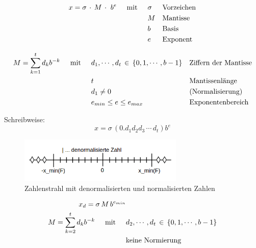 \begin{align*}
x = \sigma\,\cdot\,M\,\cdot\,\,b^e \hspace{0.5cm} \text{mit} \hspace{0.5cm} & \sigma && \text{Vorzeichen}\\
& M && \text{Mantisse} \\
& b && \text{Basis} \\
& e && \text{Exponent}
\end{align*}

\begin{align*}
M = \sum^t_{k=1} d_k b^{-k} \hspace{0.5cm} \text{mit} \hspace{0.5cm} & d_1,\cdots,d_t\, \in\,\{0,1,\cdots,b-1\} && \text{Ziffern der Mantisse}\\
& t && \text{Mantissenlänge} \\
& d_1 \neq 0 && \text{(Normalisierung)} \\
& e_{min} \leq e \leq e_{max} && \text{Exponentenbereich}
\end{align*}

Schreibweise:
\begin{equation*}
x = \sigma\,(0.d_1d_2d_3\,\cdots\,d_t)b^e
\end{equation*}

\begin{figure}[htbp]
  \centering
  \includegraphics[width=0.7\textwidth]{figures/denormalisiertezahlen.png}
  \caption{Zahlenstrahl mit denormalisierten und normalisierten Zahlen}
  \label{fig:denormalisiert}
\end{figure}

\begin{align*}
x_d = \sigma\,M\,b^{e_{min}} &\\
M = \sum^t_{k=2} d_k b^{-k} \hspace{0.5cm} \text{mit} \hspace{0.5cm} & d_2,\cdots,d_t\, \in\,\{0,1,\cdots,b-1\} \\
& \text{keine Normierung} 
\end{align*}


